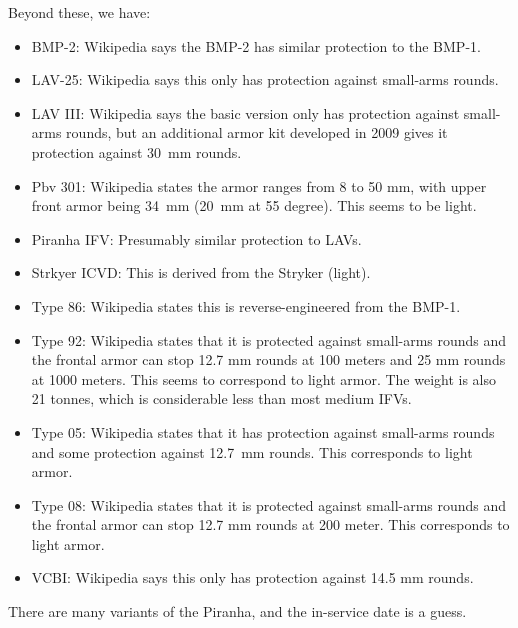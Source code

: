 {    Beyond these, we have:
    \begin{itemize}
        \item BMP-2: Wikipedia says the BMP-2 has similar protection to the BMP-1.
        \item LAV-25: Wikipedia says this only has protection against small-arms rounds.
        \item LAV III: Wikipedia says the basic version only has protection against small-arms rounds, but an additional armor kit developed in 2009 gives it protection against 30~mm rounds.
        \item Pbv 301: Wikipedia states the armor ranges from 8 to 50 mm, with upper front armor being 34~mm (20~mm at 55 degree). This seems to be light.
        \item Piranha IFV: Presumably similar protection to LAVs.
        \item Strkyer ICVD: This is derived from the Stryker (light).
        \item Type 86: Wikipedia states this is reverse-engineered from the BMP-1.
        \item Type 92: Wikipedia states that it is protected against small-arms rounds and the frontal armor can stop 12.7 mm rounds at 100 meters and 25 mm rounds at 1000 meters. This seems to correspond to light armor. The weight is also 21 tonnes, which is considerable less than most medium IFVs.
        \item Type 05: Wikipedia states that it has protection against small-arms rounds and some protection against 12.7~mm rounds. This corresponds to light armor.
        \item Type 08: Wikipedia states that it is protected against small-arms rounds and the frontal armor can stop 12.7 mm rounds at 200 meter. This corresponds to light armor.
        \item VCBI: Wikipedia says this only has protection against 14.5 mm rounds.
    \end{itemize}

    There are many variants of the Piranha, and the in-service date is a guess.
}


